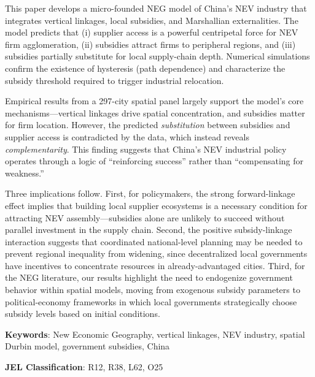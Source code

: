\documentclass[11pt,a4paper]{article}
\begin{document}
This paper develops a micro-founded NEG model of China's NEV industry that integrates vertical linkages, local subsidies, and Marshallian externalities. The model predicts that (i) supplier access is a powerful centripetal force for NEV firm agglomeration, (ii) subsidies attract firms to peripheral regions, and (iii) subsidies partially substitute for local supply-chain depth. Numerical simulations confirm the existence of hysteresis (path dependence) and characterize the subsidy threshold required to trigger industrial relocation.

Empirical results from a 297-city spatial panel largely support the model's core mechanisms---vertical linkages drive spatial concentration, and subsidies matter for firm location. However, the predicted \textit{substitution} between subsidies and supplier access is contradicted by the data, which instead reveals \textit{complementarity}. This finding suggests that China's NEV industrial policy operates through a logic of ``reinforcing success'' rather than ``compensating for weakness.''

Three implications follow. First, for policymakers, the strong forward-linkage effect implies that building local supplier ecosystems is a necessary condition for attracting NEV assembly---subsidies alone are unlikely to succeed without parallel investment in the supply chain. Second, the positive subsidy-linkage interaction suggests that coordinated national-level planning may be needed to prevent regional inequality from widening, since decentralized local governments have incentives to concentrate resources in already-advantaged cities. Third, for the NEG literature, our results highlight the need to endogenize government behavior within spatial models, moving from exogenous subsidy parameters to political-economy frameworks in which local governments strategically choose subsidy levels based on initial conditions.

\vspace{12pt}
\noindent\textbf{Keywords}: New Economic Geography, vertical linkages, NEV industry, spatial Durbin model, government subsidies, China

\noindent\textbf{JEL Classification}: R12, R38, L62, O25



\end{document}
